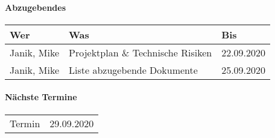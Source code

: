 \paragraph{Abzugebendes}
\begin{tabbing}
	\begin{tabu} to \linewidth {l X l }
        \toprule
        \textbf{Wer} & \textbf{Was} & \textbf{Bis} \\
		\midrule
		Janik, Mike & Projektplan \& Technische Risiken & 22.09.2020 \\
		Janik, Mike & Liste abzugebende Dokumente & 25.09.2020 \\
		\bottomrule
    \end{tabu}
\end{tabbing}

\paragraph{Nächste Termine} \hfill
\begin{table}[h!]
	\begin{tabularx}{\textwidth}{l X }
		Termin & 29.09.2020 \\
	\end{tabularx}
\end{table}

\clearpage